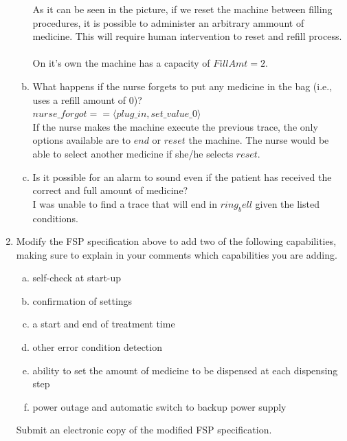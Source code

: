 \documentclass{article}
\begin{document}
\begin{enumerate}[1.]
\begin{enumerate}[a.]
      As it can be seen in the picture, if we reset the machine between filling procedures, it is possible to administer an arbitrary ammount of medicine. This will require human intervention to reset and refill process. \\
      \\
    On it's own the machine has a capacity of $FillAmt=2$. \\  
  \item What happens if the nurse forgets to put any medicine in the bag (i.e., uses a refill amount of 0)? \\
    $ nurse\_forgot == \langle plug\_in, set\_value\_0 \rangle$ \\
    If the nurse makes the machine execute the previous trace, the only options available are to $end$ or $reset$ the machine. The nurse would be able to select another medicine if she/he selects $reset$.
  \item Is it possible for an alarm to sound even if the patient has received the correct and full amount of medicine? \\
    I was unable to find a trace that will end in $ring_bell$ given the listed conditions. \\ 
    \end{enumerate}

 \item Modify the FSP specification above to add two of the following capabilities, making sure
 to explain in your comments which capabilities you are adding.
 \begin{enumerate}[a.]
    \item self-check at start-up
    \item confirmation of settings
    \item a start and end of treatment time
    \item other error condition detection
    \item ability to set the amount of medicine to be dispensed at each dispensing step
    \item power outage and automatic switch to backup power supply
    \end{enumerate}
 Submit an electronic copy of the modified FSP specification.
\end{enumerate}

\clearpage
\end{document}
